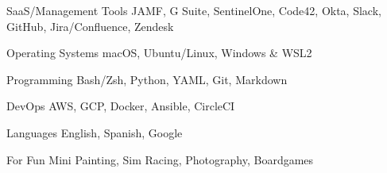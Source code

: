 

\begin{cvskills}


  \cvskill
    {SaaS/Management Tools} %
    {JAMF, G Suite, SentinelOne, Code42, Okta, Slack, GitHub, Jira/Confluence, Zendesk} %

  \cvskill
    {Operating Systems} %
    {macOS, Ubuntu/Linux, Windows \& WSL2} %

  \cvskill
    {Programming} %
    {Bash/Zsh, Python, YAML, Git, Markdown} %

  \cvskill
    {DevOps} %
    {AWS, GCP, Docker, Ansible, CircleCI} %

  \cvskill
    {Languages} %
    {English, Spanish, Google} %

  \cvskill
    {For Fun}
    {Mini Painting, Sim Racing, Photography, Boardgames}

\end{cvskills}
